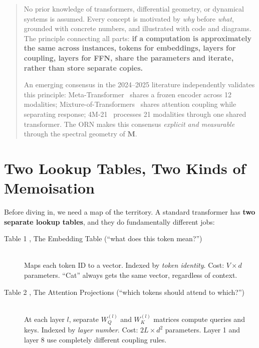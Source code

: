 \documentclass[11pt, a4paper]{article}
\newcommand{\M}{\mathbf{M}}
\theoremstyle{remark}
\begin{document}
\begin{abstract}
No prior knowledge of transformers, differential geometry, or dynamical systems is assumed.
Every concept is motivated by \emph{why} before \emph{what}, grounded with concrete numbers, and illustrated with code and diagrams.
The principle connecting all parts: \textbf{if a computation is approximately the same across instances, tokens for embeddings, layers for coupling, layers for FFN, share the parameters and iterate, rather than store separate copies.}

An emerging consensus in the 2024--2025 literature independently validates this principle: Meta-Transformer~\cite{zhang2023metatransformer} shares a frozen encoder across 12 modalities; Mixture-of-Transformers~\cite{liang2024mot} shares attention coupling while separating response; 4M-21~\cite{bachmann2024fourm} processes 21 modalities through one shared transformer.
The ORN makes this consensus \emph{explicit and measurable} through the spectral geometry of $\M$.
\end{abstract}

\tableofcontents
\newpage

\section{Two Lookup Tables, Two Kinds of Memoisation}
\label{sec:two-tables}

Before diving in, we need a map of the territory.
A standard transformer has \textbf{two separate lookup tables}, and they do fundamentally different jobs:

\begin{description}
    \item[Table 1 ,  The Embedding Table \textnormal{(``what does this token mean?'')}] \hfill\\
    Maps each token ID to a vector.
    Indexed by \emph{token identity}.
    Cost: $V \times d$ parameters.
    ``Cat'' always gets the same vector, regardless of context.

    \item[Table 2 ,  The Attention Projections \textnormal{(``which tokens should attend to which?'')}] \hfill\\
    At each layer $l$, separate $W_Q^{(l)}$ and $W_K^{(l)}$ matrices compute queries and keys.
    Indexed by \emph{layer number}.
    Cost: $2L \times d^2$ parameters.
    Layer 1 and layer 8 use completely different coupling rules.
\end{description}
\end{document}
